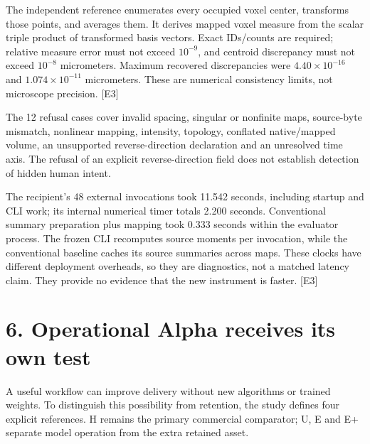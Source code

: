 \documentclass[10pt,a4paper]{article}
\begin{document}
The independent reference enumerates every occupied voxel center,
transforms those points, and averages them. It derives mapped voxel
measure from the scalar triple product of transformed basis vectors.
Exact IDs/counts are required; relative measure error must not exceed
\(10^{-9}\), and centroid discrepancy must not exceed \(10^{-8}\)
micrometers. Maximum recovered discrepancies were \(4.40\times10^{-16}\)
and \(1.074\times10^{-11}\) micrometers. These are numerical consistency
limits, not microscope precision. {[}E3{]}

The 12 refusal cases cover invalid spacing, singular or nonfinite maps,
source-byte mismatch, nonlinear mapping, intensity, topology, conflated
native/mapped volume, an unsupported reverse-direction declaration and
an unresolved time axis. The refusal of an explicit reverse-direction
field does not establish detection of hidden human intent.

The recipient's 48 external invocations took 11.542 seconds, including
startup and CLI work; its internal numerical timer totals 2.200 seconds.
Conventional summary preparation plus mapping took 0.333 seconds within
the evaluator process. The frozen CLI recomputes source moments per
invocation, while the conventional baseline caches its source summaries
across maps. These clocks have different deployment overheads, so they
are diagnostics, not a matched latency claim. They provide no evidence
that the new instrument is faster. {[}E3{]}

\clearpage

\hypertarget{operational-alpha-receives-its-own-test}{%
\section{6. Operational Alpha receives its own
test}\label{operational-alpha-receives-its-own-test}}

A useful workflow can improve delivery without new algorithms or trained
weights. To distinguish this possibility from retention, the study
defines four explicit references. H remains the primary commercial
comparator; U, E and E+ separate model operation from the extra retained
asset.
\end{document}
